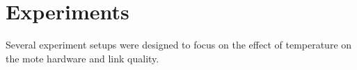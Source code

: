 \chapter{Experiments}

Several experiment setups were designed to focus on the effect of temperature on the mote hardware and link quality.






